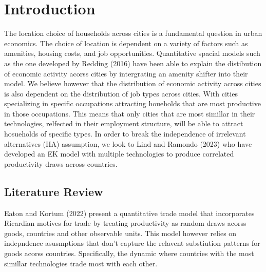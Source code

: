 \documentclass[10pt]{article}
\begin{document}





\section{Introduction}

The location choice of households across cities is a fundamental question in urban economics. The choice of location is dependent on a variety of factors such as amenities, housing costs, and job opportunities. Quantitative spacial models such as the one developed by Redding (2016) have been able to explain the distibution of economic activity acorss cities by intergrating an amenity shifter into their model. We believe however that the distribution of economic activity across cities is also dependent on the distribution of job types across cities. With cities specializing in specific occupations attracting houeholds that are most productive in those occupations. This means that only cities that are most simillar in their technologies, relfected in their employment structure, will be able to attract hosueholds of specific types. In order to break the independence of irrelevant alternatives (IIA) assumption, we look to Lind and Ramondo (2023) who have developed an EK model with multiple technologies to produce correlated productivity draws across countries.

\subsection{Literature Review}

Eaton and Kortum (2022) present a quantitative trade model that incorporates Ricardian motives for trade by treating productivity as random draws acorss goods, countries and other observable units. This model however relies on indepndence asusmptions that don't capture the relavent substiution patterns for goods acorss countries. Specifically, the dynamic where countries with the most simillar technologies trade most with each other.
\end{document}
